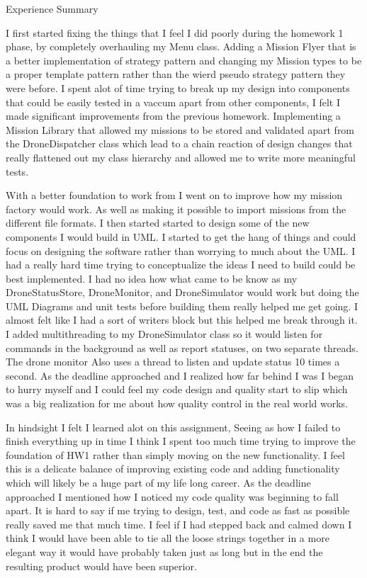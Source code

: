 \documentclass[12pt]{article}
\begin{document}
Experience Summary 


I first started fixing the things that I feel I did poorly during the homework 1 phase, by completely overhauling my Menu class. Adding a Mission Flyer that is a better implementation of strategy pattern 
and changing my Mission types to be a proper template pattern rather than the wierd pseudo strategy pattern they were before.
I spent alot of time trying to break up my design into components that could be easily tested in a vaccum apart from other components, I felt I made significant improvements from the previous homework.
Implementing a Mission Library that allowed my missions to be stored and validated apart from the DroneDispatcher class which lead to a chain reaction of design changes 
that really flattened out my class hierarchy and allowed me to write more meaningful tests.

With a better foundation to work from I went on to improve how my mission factory would work. As well as making it possible to import missions from the different file formats.
I then started started to design some of the new components I would build in UML. I started to get the hang of things and could focus on designing the software rather than worrying to much about the UML.
I had a really hard time trying to conceptualize the ideas I need to build could be best implemented. I had no idea how what came to be know as my DroneStatusStore, DroneMonitor, and DroneSimulator would work
but doing the UML Diagrams and unit tests before building them really helped me get going. I almost felt like I had a sort of writers block but this helped me break through it.
I added multithreading to my DroneSimulator class so it would listen for commands in the background as well as report statuses, on two separate threads. The drone monitor Also uses a thread to listen and update status 10 times a second.
As the deadline approached and I realized how far behind I was I began to hurry myself and I could feel my code design and quality start to slip which was a big realization for me about how quality control in the real world works.

In hindsight I felt I learned alot on this assignment, Seeing as how I failed to finish everything up in time I think I spent too much time trying to improve the foundation of HW1 rather than simply moving on the new functionality.
I feel this is a delicate balance of improving existing code and adding functionality which will likely be a huge part of my life long career. As the deadline approached I mentioned how I noticed my code quality was beginning to fall apart.
It is hard to say if me trying to design, test, and code as fast as possible really saved me that much time. I feel if I had stepped back and calmed down I think I would have been able to tie all the loose strings together in a more elegant way
it would have probably taken just as long but in the end the resulting product would have been superior.
\end{document}
